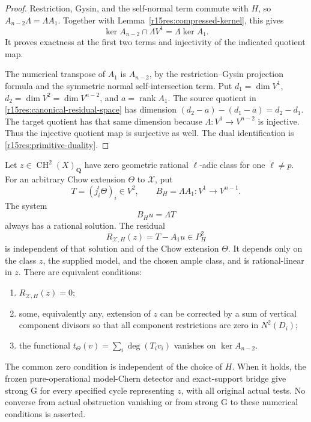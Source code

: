 \begin{proof}
Restriction, Gysin, and the self-normal term commute with $H$,
so $A_{n-2}\Lambda=\Lambda A_1$.
Together with Lemma~\ref{r15res:compressed-kernel}, this gives
\[
       \ker A_{n-2}\cap\Lambda V^1=\Lambda\ker A_1.
\]
It proves exactness at the first two terms and injectivity
of the indicated quotient map.

The numerical transpose of $A_1$ is $A_{n-2}$, by the
restriction--Gysin projection formula and the symmetric normal
self-intersection term.  Put $d_1=\dim V^1$,
$d_2=\dim V^2=\dim V^{n-2}$, and $a=\operatorname{rank}A_1$.
The source quotient in \eqref{r15res:canonical-residual-space}
has dimension
$(d_2-a)-(d_1-a)=d_2-d_1$.
The target quotient has that same dimension because
$\Lambda:V^1\to V^{n-2}$ is injective.
Thus the injective quotient map is surjective as well.
The dual identification is \eqref{r15res:primitive-duality}.
\end{proof}

\begin{theorem}
\label{r15res:canonical-residual}
Let $z\in\operatorname{CH}^2(X)_{\mathbf Q}$ have zero
geometric rational $\ell$-adic class for one $\ell\ne p$.
For an arbitrary Chow extension $\Theta$ to $\mathcal X$, put
\[
          T=(j_i^!\Theta)_i\in V^2,
          \qquad B_H=\Lambda A_1:V^1\longrightarrow V^{n-1}.
\tag{NR15.12}\label{r15res:compressed-system}
\]
The system
\[
                         B_Hu=\Lambda T
\tag{NR15.13}\label{r15res:normalization-equation}
\]
always has a rational solution.  The residual
\[
              R_{\mathcal X,H}(z)=T-A_1u\in P_H^2
\tag{NR15.14}\label{r15res:residual}
\]
is independent of that solution and of the Chow extension
$\Theta$.  It depends only on the class $z$, the supplied
model, and the chosen ample class, and is rational-linear in $z$.
There are equivalent conditions:
\begin{enumerate}
\item $R_{\mathcal X,H}(z)=0$;
\item some, equivalently any, extension of $z$ can be corrected
by a sum of vertical component divisors so that all component
restrictions are zero in $N^2(D_i)$;
\item the functional $t_\Theta(v)=\sum_i\deg(T_i v_i)$
vanishes on $\ker A_{n-2}$.
\end{enumerate}
The common zero condition is independent of the choice of $H$.
When it holds, the frozen pure-operational model-Chern detector
and exact-support bridge give strong G for every specified
cycle representing $z$, with all original actual tests.
No converse from actual obstruction vanishing or from strong G
to these numerical conditions is asserted.
\end{theorem}

